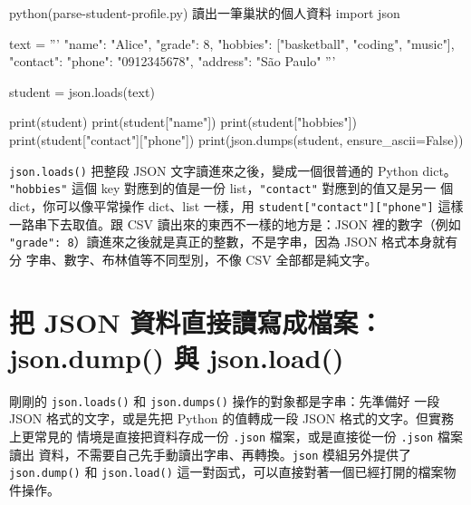 \begin{example}{python}{(parse-student-profile.py) 讀出一筆巢狀的個人資料}
import json

text = '''
{
    "name": "Alice",
    "grade": 8,
    "hobbies": ["basketball", "coding", "music"],
    "contact": {"phone": "0912345678", "address": "São Paulo"}
}
'''

student = json.loads(text)

print(student)
print(student["name"])
print(student["hobbies"])
print(student["contact"]["phone"])
print(json.dumps(student, ensure_ascii=False))
\end{example}


\texttt{json.loads()} 把整段 JSON 文字讀進來之後，變成一個很普通的 Python dict。
\texttt{"hobbies"} 這個 key 對應到的值是一份 list，\texttt{"contact"} 對應到的值又是另一
個 dict，你可以像平常操作 dict、list 一樣，用 \texttt{student["contact"]["phone"]}
這樣一路串下去取值。跟 CSV 讀出來的東西不一樣的地方是：JSON 裡的數字（例如
\texttt{"grade": 8}）讀進來之後就是真正的整數，不是字串，因為 JSON 格式本身就有分
字串、數字、布林值等不同型別，不像 CSV 全部都是純文字。


\section{把 JSON 資料直接讀寫成檔案：json.dump() 與 json.load()}
\label{sec:json-dump-load}

剛剛的 \texttt{json.loads()} 和 \texttt{json.dumps()} 操作的對象都是字串：先準備好
一段 JSON 格式的文字，或是先把 Python 的值轉成一段 JSON 格式的文字。但實務上更常見的
情境是直接把資料存成一份 \texttt{.json} 檔案，或是直接從一份 \texttt{.json} 檔案讀出
資料，不需要自己先手動讀出字串、再轉換。\texttt{json} 模組另外提供了 \texttt{json.dump()}
和 \texttt{json.load()} 這一對函式，可以直接對著一個已經打開的檔案物件操作。

